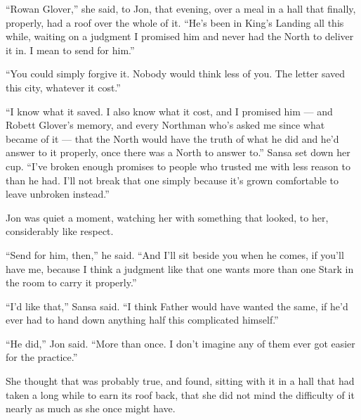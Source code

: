 “Rowan Glover,” she said, to Jon, that evening, over a meal in a hall that finally, properly, had a roof over the whole of it. “He’s been in King’s Landing all this while, waiting on a judgment I promised him and never had the North to deliver it in. I mean to send for him.”

“You could simply forgive it. Nobody would think less of you. The letter saved this city, whatever it cost.”

“I know what it saved. I also know what it cost, and I promised him — and Robett Glover’s memory, and every Northman who’s asked me since what became of it — that the North would have the truth of what he did and he’d answer to it properly, once there was a North to answer to.” Sansa set down her cup. “I’ve broken enough promises to people who trusted me with less reason to than he had. I’ll not break that one simply because it’s grown comfortable to leave unbroken instead.”

Jon was quiet a moment, watching her with something that looked, to her, considerably like respect.

“Send for him, then,” he said. “And I’ll sit beside you when he comes, if you’ll have me, because I think a judgment like that one wants more than one Stark in the room to carry it properly.”

“I’d like that,” Sansa said. “I think Father would have wanted the same, if he’d ever had to hand down anything half this complicated himself.”

“He did,” Jon said. “More than once. I don’t imagine any of them ever got easier for the practice.”

She thought that was probably true, and found, sitting with it in a hall that had taken a long while to earn its roof back, that she did not mind the difficulty of it nearly as much as she once might have.